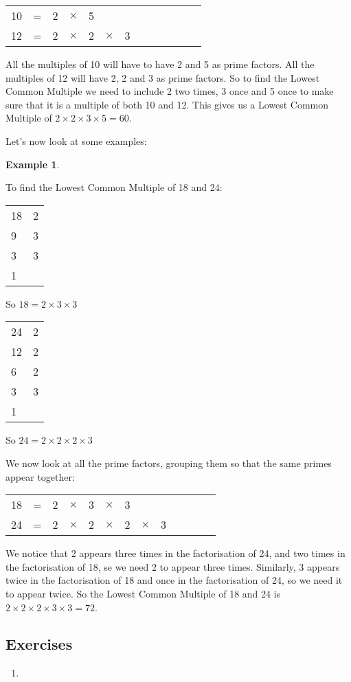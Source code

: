 \documentclass[11pt, oneside]{article}
\theoremstyle{definition}
\newtheorem{exmp}{Example}[section]
\begin{document}
\begin{tabular}{c c c c c c c c c c c c c}
10 & = & 2 & $\times$ & 5 &  &  &  &  &  &  &  &  \\
12 & = & 2 & $\times$ & 2 & $\times$ & 3 &  &  &  &  &  & 
\end{tabular}

All the multiples of 10 will have to have 2 and 5 as prime factors. All the multiples of 12 will have 2, 2 and 3 as prime factors. So to find the Lowest Common Multiple we need to include 2 two times, 3 once and 5 once to make sure that it is a multiple of both 10 and 12. This gives us a Lowest Common Multiple of $2\times 2 \times 3 \times 5 = 60$.

Let's now look at some examples:

\begin{exmp} \end{exmp}
To find the Lowest Common Multiple of 18 and 24:

\begin{tabular}{ p{0.5cm} | p{1.5cm}}
18 & 2  \\
9 & 3  \\
3 & 3  \\
1 &  
\end{tabular}

So $18 = 2 \times 3 \times 3$

\bigbreak

\begin{tabular}{ p{0.5cm} | p{1.5cm}}
24 & 2  \\
12 & 2  \\
6 & 2  \\
3 & 3  \\
1 
\end{tabular}

So $24 = 2\times 2 \times 2 \times 3$

We now look at all the prime factors, grouping them so that the same primes appear together:

\begin{tabular}{c c c c c c c c c c c c c}
18 & = & 2 & $\times$ & 3 & $\times$ & 3 &  &  &  &  &  &  \\
24 & = & 2 & $\times$ & 2 & $\times$ & 2 & $\times$ & 3 &  &  &  & 
\end{tabular}

We notice that 2 appears three times in the factorisation of 24, and two times in the factorisation of 18, se we need 2 to appear three times. Similarly, 3 appears twice in the factorisation of 18 and once in the factorisation of 24, so we need it to appear twice. So the Lowest Common Multiple of 18 and 24 is $2\times 2 \times 2 \times 3 \times 3 = 72$.



\subsection{Exercises}
\begin{enumerate}
\item 
\end{enumerate}
\end{document}
